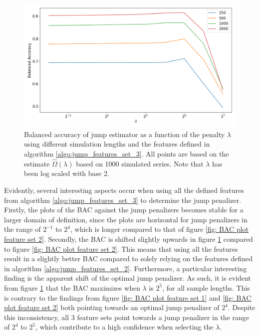 \begin{figure}[H] 
    \centering
    \includegraphics[width=1\textwidth]{analysis/model_convergence/images/jump_penalties_feature_set_3_all.png}
    \caption{Balanced accuracy of jump estimator as a function of the penalty $\lambda$ using different simulation lengths and the features defined in algorithm \ref{algo:jump_features_set_3}. All points are based on the estimate $\hat{\Omega} (\lambda)$ based on 1000 simulated series. Note that $\lambda$ has been log scaled with base 2.}
    \label{fig: BAC plot feature set 3}
\end{figure}

Evidently, several interesting aspects occur when using all the defined features from algorithm \ref{algo:jump_features_set_3} to determine the jump penalizer. Firstly, the plots of the BAC against the jump penalizers becomes stable for a larger domain of definition, since the plots are horizontal for jump penalizers in the range of $2^{-1}$ to $2^4$, which is longer compared to that of figure \ref{fig: BAC plot feature set 2}. Secondly, the BAC is shifted slightly upwards in figure \ref{fig: BAC plot feature set 3} compared to figure \ref{fig: BAC plot feature set 2}. This means that using all the features result in a slightly better BAC compared to solely relying on the features defined in algorithm \ref{algo:jump_features_set_2}. Furthermore, a particular interesting finding is the apparent shift of the optimal jump penalizer. As such, it is evident from figure \ref{fig: BAC plot feature set 3} that the BAC maximizes when $\lambda$ is $2^5$, for all sample lengths. This is contrary to the findings from figure \ref{fig: BAC plot feature set 1} and \ref{fig: BAC plot feature set 2} both pointing towards an optimal jump penalizer of $2^4$. Despite this inconsistency, all 3 feature sets point towards a jump penalizer in the range of $2^4$ to $2^5$, which contribute to a high confidence when selecting the $\lambda$.

